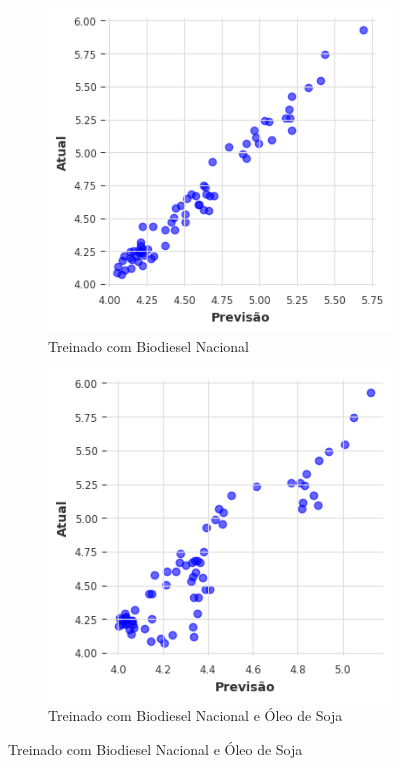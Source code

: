 \begin{figure}[htbp]
	\centering
	\begin{subfigure}[b]{0.40\textwidth}
		\centering
		\includegraphics[width=\textwidth]{figuras/nlinear_brasil_scatter.png} %
		\caption{Treinado com Biodiesel Nacional \newline}
		\label{fig:nlinear_brasil_scatter}
	\end{subfigure}
	\hfill
	\begin{subfigure}[b]{0.40\textwidth}
		\centering
		\includegraphics[width=\textwidth]{figuras/nlinear_brasil_oil_scatter.png} %
		\caption{Treinado com Biodiesel Nacional e Óleo de Soja}
		\label{fig:nlinear_brasil_oil_scatter}
	\end{subfigure}


\end{figure}
